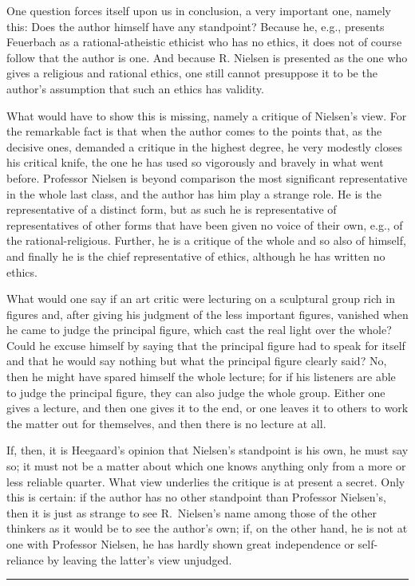 \documentclass[12pt,a4paper,openany]{book}
\newcommand{\piecerule}{\par\begin{center}\rule{1.5cm}{0.4pt}\end{center}\par}
\newcommand{\opage}[1]{\marginnote{\footnotesize\textit{[#1]}}}
\begin{document}
One question forces itself upon us in conclusion, a very important one,
namely this: Does the author himself have any standpoint? Because he, e.g.,
presents Feuerbach as a rational-atheistic ethicist who has no ethics, it
does not of course follow that the author is one. And because R. Nielsen is
presented as the one who gives a religious and rational ethics, one still
cannot presuppose it to be the author's assumption that such an ethics has
validity.

What would have to show this is missing, namely a critique of Nielsen's
view. For the remarkable fact is that when the author comes to the points
that, as the decisive ones, demanded a critique in the highest degree, he
very modestly closes his critical knife, the one he has used so vigorously
and bravely in what went before. Professor Nielsen is beyond comparison the
most significant representative in the whole last class, and the author
has him play a strange role. He is the representative of a distinct form,
but as such he is representative of representatives of other forms that
have been given no voice of their own, e.g., of the rational-religious.
Further, he is a critique of the whole and so also of himself, and finally
he is the chief representative of ethics, although he has written no
ethics.

What would one say if an art critic were lecturing on a sculptural group
rich in figures and, after giving his judgment of the less important
figures, vanished when he came to judge the principal figure, which cast
the real light over the whole? Could he excuse himself by saying that the
principal figure had to speak for itself and that he would say nothing but
what the principal figure clearly said? No, then he might have spared
himself the whole lecture; for if his listeners are able to judge the
principal figure, they can also judge
\opage{33}the whole group. Either one gives a lecture, and then one gives it
to the end, or one leaves it to others to work the matter out for
themselves, and then there is no lecture at all.

If, then, it is Heegaard's opinion that Nielsen's standpoint is his own,
he must say so; it must not be a matter about which one knows anything only
from a more or less reliable quarter. What view underlies the critique is
at present a secret. Only this is certain: if the author has no other
standpoint than Professor Nielsen's, then it is just as strange to see
R.~Nielsen's name among those of the other thinkers as it would be to see the
author's own; if, on the other hand, he is not at one with Professor
Nielsen, he has hardly shown great independence or self-reliance by
leaving the latter's view unjudged.
\piecerule
\end{document}
